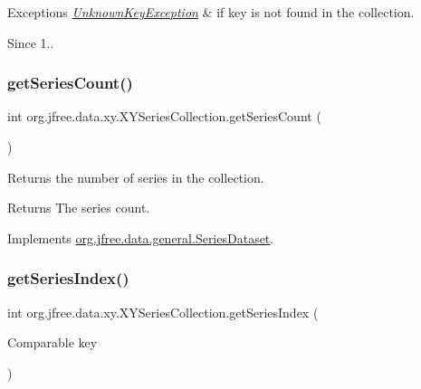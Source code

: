 \begin{DoxyExceptions}{Exceptions}
{\em \mbox{\hyperlink{classorg_1_1jfree_1_1data_1_1_unknown_key_exception}{Unknown\+Key\+Exception}}} & if {\ttfamily key} is not found in the collection.\\
\hline
\end{DoxyExceptions}
\begin{DoxySince}{Since}
1.. 
\end{DoxySince}
\mbox{\label{classorg_1_1jfree_1_1data_1_1xy_1_1_x_y_series_collection_ab50b1e302d11ddf25ef86dba1b2d4ffe}} 
\subsubsection{\texorpdfstring{get\+Series\+Count()}{getSeriesCount()}}
{\footnotesize\ttfamily int org.\+jfree.\+data.\+xy.\+X\+Y\+Series\+Collection.\+get\+Series\+Count (\begin{DoxyParamCaption}{ }\end{DoxyParamCaption})}

Returns the number of series in the collection.

\begin{DoxyReturn}{Returns}
The series count. 
\end{DoxyReturn}


Implements \mbox{\hyperlink{interfaceorg_1_1jfree_1_1data_1_1general_1_1_series_dataset_a84fe822f5918f941d9de1ed1b73c9f58}{org.\+jfree.\+data.\+general.\+Series\+Dataset}}.

\mbox{\label{classorg_1_1jfree_1_1data_1_1xy_1_1_x_y_series_collection_a5f6800bb62c798125089dc749e29dc07}} 
\subsubsection{\texorpdfstring{get\+Series\+Index()}{getSeriesIndex()}}
{\footnotesize\ttfamily int org.\+jfree.\+data.\+xy.\+X\+Y\+Series\+Collection.\+get\+Series\+Index (\begin{DoxyParamCaption}\item[{Comparable}]{key }\end{DoxyParamCaption})}


